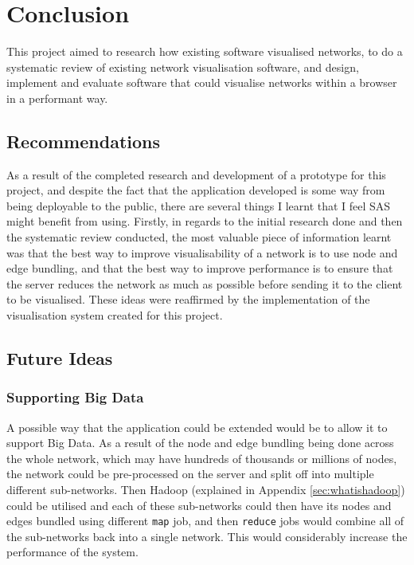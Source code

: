 \documentclass[../dissertation.tex]{subfiles}
\begin{document}
\chapter{Conclusion}

This project aimed to research how existing software visualised networks, to do a systematic review of existing network visualisation software, and design, implement and evaluate software that could visualise networks within a browser in a performant way. 

\section{Recommendations}

As a result of the completed research and development of a prototype for this project, and despite the fact that the application developed is some way from being deployable to the public, there are several things I learnt that I feel SAS might benefit from using. Firstly, in regards to the initial research done and then the systematic review conducted, the most valuable piece of information learnt was that the best way to improve visualisability of a network is to use node and edge bundling, and that the best way to improve performance is to ensure that the server reduces the network as much as possible before sending it to the client to be visualised. These ideas were reaffirmed by the implementation of the visualisation system created for this project.

\section{Future Ideas}
\label{sec:further_ideas}

\subsection{Supporting Big Data}

A possible way that the application could be extended would be to allow it to support Big Data. As a result of the node and edge bundling being done across the whole network, which may have hundreds of thousands or millions of nodes, the network could be pre-processed on the server and split off into multiple different sub-networks. Then Hadoop \cite{hadoop} (explained in Appendix \ref{sec:whatishadoop}) could be utilised and each of these sub-networks could then have its nodes and edges bundled using different \texttt{map} job, and then \texttt{reduce} jobs would combine all of the sub-networks back into a single network. This would considerably increase the performance of the system.
\end{document}
